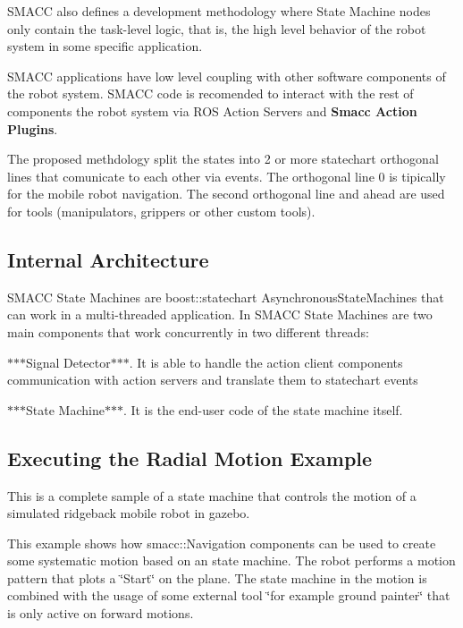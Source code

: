 S\-M\-A\-C\-C also defines a development methodology where State Machine nodes only contain the task-\/level logic, that is, the high level behavior of the robot system in some specific application.

S\-M\-A\-C\-C applications have low level coupling with other software components of the robot system. S\-M\-A\-C\-C code is recomended to interact with the rest of components the robot system via R\-O\-S Action Servers and {\bfseries Smacc Action Plugins}.

The proposed methdology split the states into 2 or more statechart orthogonal lines that comunicate to each other via events. The orthogonal line 0 is tipically for the mobile robot navigation. The second orthogonal line and ahead are used for tools (manipulators, grippers or other custom tools).

 

\subsection*{Internal Architecture}

S\-M\-A\-C\-C State Machines are boost\-::statechart Asynchronous\-State\-Machines that can work in a multi-\/threaded application. In S\-M\-A\-C\-C State Machines are two main components that work concurrently in two different threads\-:


\begin{DoxyItemize}
\item $\ast$$\ast$$\ast$\-Signal Detector$\ast$$\ast$$\ast$. It is able to handle the action client components communication with action servers and translate them to statechart events
\item $\ast$$\ast$$\ast$\-State Machine$\ast$$\ast$$\ast$. It is the end-\/user code of the state machine itself.
\end{DoxyItemize}

 

\subsection*{Executing the Radial Motion Example}

This is a complete sample of a state machine that controls the motion of a simulated ridgeback mobile robot in gazebo.

This example shows how smacc\-::\-Navigation components can be used to create some systematic motion based on an state machine. The robot performs a motion pattern that plots a \char`\"{}\-Start\char`\"{} on the plane. The state machine in the motion is combined with the usage of some external tool \char`\"{}for example ground painter\char`\"{} that is only active on forward motions.

